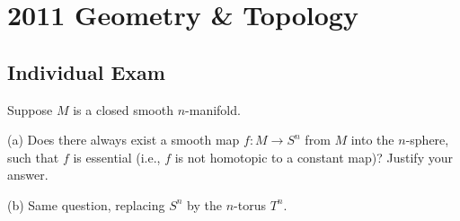 \section{2011 Geometry \& Topology}

\subsection{Individual Exam}

\begin{exercise}
\label{geometry:2011:1}
Suppose $M$ is a closed smooth $n$-manifold.

(a) Does there always exist a smooth map $f : M \to S^{n}$ from $M$ into the $n$-sphere, such that $f$ is essential (i.e., $f$ is not homotopic to a constant map)? Justify your answer.

(b) Same question, replacing $S^{n}$ by the $n$-torus $T^{n}$.
\end{exercise}

